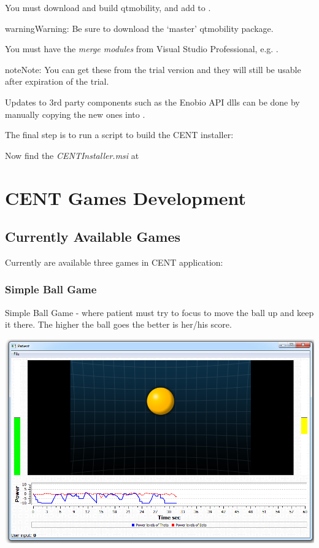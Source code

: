 \documentclass[letterpaper,10pt,english]{sphinxmanual}
\begin{document}
You must download and build qtmobility, and add to .

\begin{notice}{warning}{Warning:}
Be sure to download the `master' qtmobility package.
\end{notice}

You must have the \emph{merge modules} from Visual Studio Professional, e.g. .

\begin{notice}{note}{Note:}
You can get these from the trial version and they will still be usable after expiration of the trial.
\end{notice}

Updates to 3rd party components such as the Enobio API dlls can be done by manually copying the new ones into .

The final step is to run a script to build the CENT installer:

Now find the \emph{CENTInstaller.msi} at 


\section{\textbf{CENT Games Development}}
\label{index:cent-games-development}

\subsection{\textbf{Currently Available Games}}
\label{index:currently-available-games}
Currently are available three games in CENT application:


\subsubsection{Simple Ball Game}
\label{index:simple-ball-game}
Simple Ball Game - where patient must try to focus to move the ball up and keep it there. The higher the ball goes the better is her/his score.

{\hfill\includegraphics{SimpleBallGame.PNG}\hfill}
\end{document}
